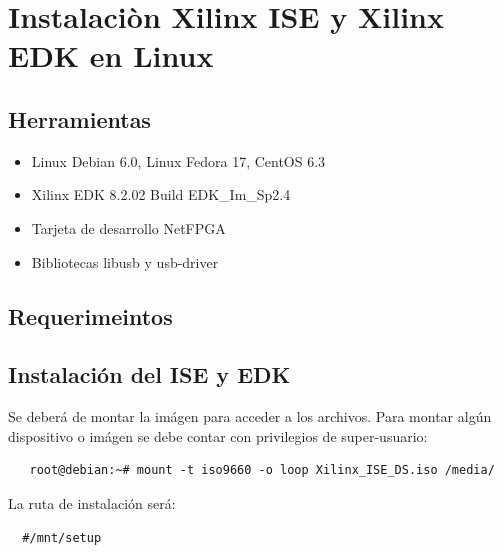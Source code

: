 \chapter{Instalaciòn Xilinx ISE y Xilinx EDK en Linux}\label{ApexA}



\section{Herramientas}

\begin{itemize}
 \item Linux Debian 6.0, Linux Fedora 17, CentOS 6.3
 \item Xilinx EDK 8.2.02 Build EDK\_Im\_Sp2.4
 \item Tarjeta de desarrollo NetFPGA
 \item Bibliotecas libusb y usb-driver
\end{itemize}


\section{Requerimeintos}

\section{Instalación del ISE y EDK}


Se deberá de  montar la imágen para acceder a los archivos. 
Para montar algún dispositivo o imágen se debe contar con privilegios de 
super-usuario:

  \begin{verbatim}	
   root@debian:~# mount -t iso9660 -o loop Xilinx_ISE_DS.iso /media/ 
  \end{verbatim}

La ruta de instalación será:

  \begin{verbatim}	
  #/mnt/setup 
  \end{verbatim}
  
